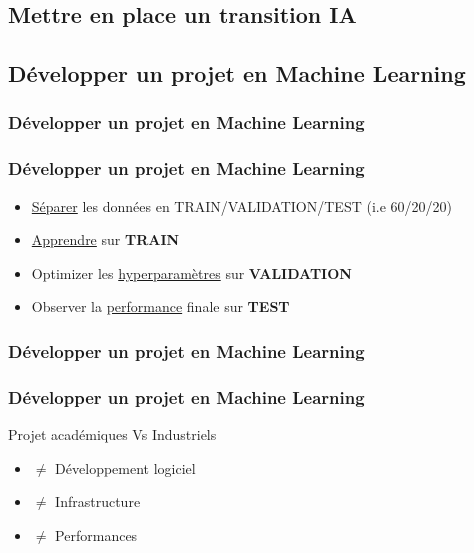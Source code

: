\subsection{Mettre en place un transition IA}
\subsection{Développer un projet en Machine Learning}

\begin{frame}
  \frametitle{Développer un projet en Machine Learning}
\end{frame}

\begin{frame}
  \frametitle{Développer un projet en Machine Learning}
  \begin{itemize}
  \item \underline{Séparer} les données en TRAIN/VALIDATION/TEST (i.e 60/20/20)
  \item \underline{Apprendre} sur \textbf{TRAIN}
  \item Optimizer les \underline{hyperparamètres} sur \textbf{VALIDATION}
  \item Observer la \underline{performance} finale sur \textbf{TEST}
  \end{itemize}
\end{frame}

\begin{frame}
  \frametitle{Développer un projet en Machine Learning}
\end{frame}

\begin{frame}
  \frametitle{Développer un projet en Machine Learning}
  Projet académiques Vs Industriels
  \begin{itemize}
  \item $\neq$ Développement logiciel
  \item $\neq$ Infrastructure
  \item $\neq$ Performances
  \end{itemize}
\end{frame}

